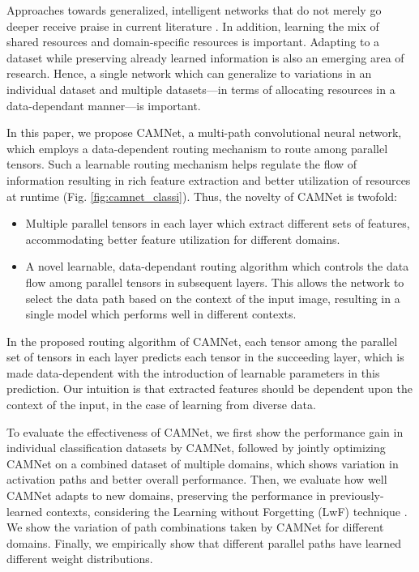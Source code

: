 \documentclass[10pt,twocolumn,letterpaper]{article}
\begin{document}
Approaches towards generalized, intelligent networks that do not merely go deeper receive praise in current literature \cite{ ha2016hypernetworks,  emrouting, sabour2017dynamic, srivastava2015highway}. In addition, learning the mix of shared resources and domain-specific resources is important. Adapting to a dataset while preserving already learned information \cite{ewc, li2018learning,piggyback} is also an emerging area of research. Hence, a single network which can generalize to variations in an individual dataset and multiple datasets---in terms of allocating resources in a data-dependant manner---is important.






In this paper, we propose CAMNet, a multi-path convolutional neural network, which employs a data-dependent routing mechanism to route among parallel tensors. Such a learnable routing mechanism helps regulate the flow of information resulting in rich feature extraction and better utilization of resources at runtime (Fig. \ref{fig:camnet_classi}). Thus, the novelty of CAMNet is twofold:
\begin{itemize}
	\vspace{-0.08in}
	\item Multiple parallel tensors in each layer which extract different sets of features, 
	accommodating better feature utilization for different domains.
	\vspace{-0.1in}	
	\item A novel learnable, data-dependant routing algorithm which controls the data flow among parallel tensors in subsequent layers. This allows the network to select the data path based on the context of the input image, resulting in a single model which performs well in different contexts.
\end{itemize} 











In the proposed routing algorithm of CAMNet, each tensor among the parallel set of tensors in each layer predicts each tensor in the succeeding layer, which is made data-dependent with the introduction of learnable parameters in this prediction. 
Our intuition is that extracted features should be dependent upon the context of the input, in the case of learning from diverse data. 


To evaluate the effectiveness of CAMNet, we first show the performance gain in individual classification datasets by CAMNet, followed by jointly optimizing CAMNet on a combined dataset of multiple domains, which shows variation in activation paths and better overall performance. Then, we evaluate how well CAMNet adapts to new domains, preserving the performance in previously-learned contexts, considering the Learning without Forgetting (LwF) technique \cite{li2018learning}. We show the variation of path combinations taken by CAMNet for different domains. Finally, we empirically show that different parallel paths have learned different weight distributions.
\end{document}
